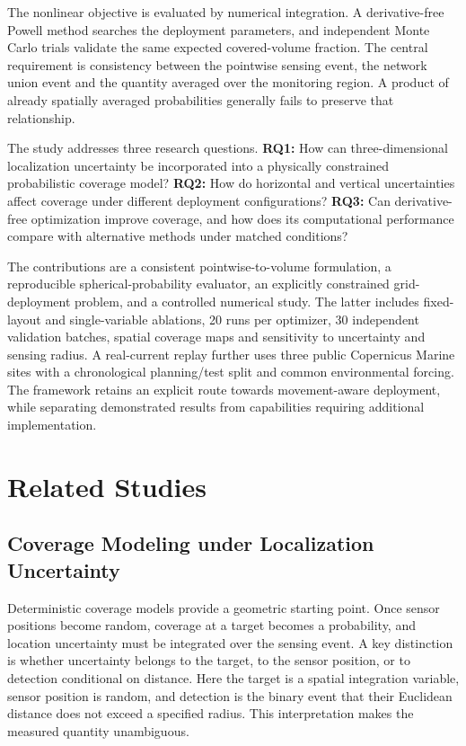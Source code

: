 \documentclass[fleqn,10pt]{wlscirep}
\begin{document}
The nonlinear objective is evaluated by numerical integration. A derivative-free Powell method\cite{powell1964} searches the deployment parameters, and independent Monte Carlo trials\cite{metropolis1949} validate the same expected covered-volume fraction. The central requirement is consistency between the pointwise sensing event, the network union event and the quantity averaged over the monitoring region. A product of already spatially averaged probabilities generally fails to preserve that relationship.

The study addresses three research questions. \textbf{RQ1:} How can three-dimensional localization uncertainty be incorporated into a physically constrained probabilistic coverage model? \textbf{RQ2:} How do horizontal and vertical uncertainties affect coverage under different deployment configurations? \textbf{RQ3:} Can derivative-free optimization improve coverage, and how does its computational performance compare with alternative methods under matched conditions?

The contributions are a consistent pointwise-to-volume formulation, a reproducible spherical-probability evaluator, an explicitly constrained grid-deployment problem, and a controlled numerical study. The latter includes fixed-layout and single-variable ablations, 20 runs per optimizer, 30 independent validation batches, spatial coverage maps and sensitivity to uncertainty and sensing radius. A real-current replay further uses three public Copernicus Marine sites with a chronological planning/test split and common environmental forcing. The framework retains an explicit route towards movement-aware deployment, while separating demonstrated results from capabilities requiring additional implementation.

\section*{Related Studies}
\subsection*{Coverage Modeling under Localization Uncertainty}
Deterministic coverage models provide a geometric starting point\cite{huang2003,zou2004}. Once sensor positions become random, coverage at a target becomes a probability, and location uncertainty must be integrated over the sensing event\cite{zouuncertainty2004}. A key distinction is whether uncertainty belongs to the target, to the sensor position, or to detection conditional on distance. Here the target is a spatial integration variable, sensor position is random, and detection is the binary event that their Euclidean distance does not exceed a specified radius. This interpretation makes the measured quantity unambiguous.
\end{document}
